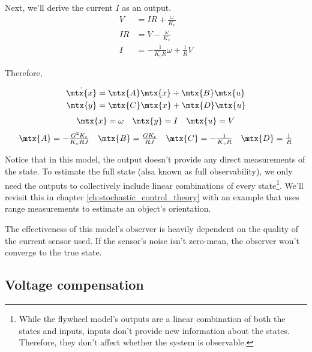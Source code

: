 Next, we'll derive the current $I$ as an output.
\begin{align*}
  V &= IR + \frac{\omega}{K_v} \\
  IR &= V - \frac{\omega}{K_v} \\
  I &= -\frac{1}{K_v R} \omega + \frac{1}{R} V
\end{align*}

Therefore,
\begin{theorem}
  \begin{align*}
    \dot{\mtx{x}} &= \mtx{A} \mtx{x} + \mtx{B} \mtx{u} \\
    \mtx{y} &= \mtx{C} \mtx{x} + \mtx{D} \mtx{u}
  \end{align*}
  \begin{equation*}
    \begin{array}{ccc}
      \mtx{x} = \omega &
      \mtx{y} = I &
      \mtx{u} = V
    \end{array}
  \end{equation*}
  \begin{equation}
    \begin{array}{cccc}
      \mtx{A} = -\frac{G^2 K_t}{K_v RJ} &
      \mtx{B} = \frac{G K_t}{RJ} &
      \mtx{C} = -\frac{1}{K_v R} &
      \mtx{D} = \frac{1}{R}
    \end{array}
  \end{equation}
\end{theorem}

Notice that in this \gls{model}, the \gls{output} doesn't provide any direct
measurements of the \gls{state}. To estimate the full \gls{state} (alsa known as
full observability), we only need the \glspl{output} to collectively include
linear combinations of every \gls{state}\footnote{While the flywheel model's
outputs are a linear combination of both the states and inputs, \glspl{input}
don't provide new information about the \glspl{state}. Therefore, they don't
affect whether the system is observable.}. We'll revisit this in chapter
\ref{ch:stochastic_control_theory} with an example that uses range measurements
to estimate an object's orientation.

The effectiveness of this \gls{model}'s \gls{observer} is heavily dependent on
the quality of the current sensor used. If the sensor's noise isn't zero-mean,
the \gls{observer} won't converge to the true \gls{state}.

\subsection{Voltage compensation}

